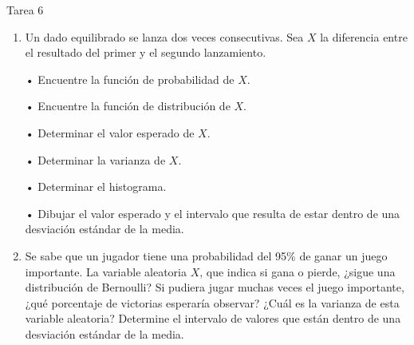 \documentclass[a4paper, 12pt]{article}
\newcommand{\Pspace}{0.5cm}
\newcommand{\Aspace}{0.2cm}
\begin{document}
\newpage
\begin{center}
    { \LARGE Tarea 6}
\end{center}

\begin{enumerate}
    \item Un dado equilibrado se lanza dos veces consecutivas. Sea $X$ la diferencia entre el resultado del primer y el segundo lanzamiento.
    \vspace{\Aspace} \par
    • Encuentre la función de probabilidad de $X$.
    \\ { \color{azul}  }

    \vspace{\Aspace} \par
    • Encuentre la función de distribución de $X$.
    \\ { \color{azul}  }

    \vspace{\Aspace} \par
    • Determinar el valor esperado de $X$.
    \\ { \color{azul}  }

    \vspace{\Aspace} \par
    • Determinar la varianza de $X$.
    \\ { \color{azul}  }

    \vspace{\Aspace} \par
    • Determinar el histograma.
    \\ { \color{azul}  }

    \vspace{\Aspace} \par
    • Dibujar el valor esperado y el intervalo que resulta de estar dentro de una desviación estándar de la media.
    \\ { \color{azul}  }


    \vspace{\Pspace}
    \item Se sabe que un jugador tiene una probabilidad del 95\% de ganar un juego importante. La variable aleatoria $X$, que indica si gana o pierde, ¿sigue una distribución de Bernoulli? Si pudiera jugar muchas veces el juego importante, ¿qué porcentaje de victorias esperaría observar? ¿Cuál es la varianza de esta variable aleatoria? Determine el intervalo de valores que están dentro de una desviación estándar de la media.
    \vspace{\Aspace} \par
    { \color{azul}  }
\end{enumerate}
\end{document}
